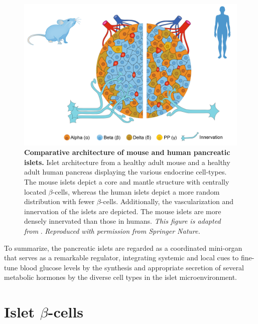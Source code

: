 \begin{figure}[H]
    \centering
    \includegraphics[width=12cm]{Chapter1/Fig/F1-2-1-01.png}
    \caption[Comparative architecture of mouse and human pancreatic islets]{\textbf{Comparative architecture of mouse and human pancreatic islets.} Islet architecture from a healthy adult mouse and a healthy adult human pancreas displaying the various endocrine cell-types. The mouse islets depict a core and mantle structure with centrally located $\beta$-cells, whereas the human islets depict a more random distribution with fewer $\beta$-cells. Additionally, the vascularization and innervation of the islets are depicted. The mouse islets are more densely innervated than those in humans. \textit{This figure is adapted from }\textbf{\cite{jain_targeting_2022,noguchi_integrating_2019}}. \textit{ Reproduced with permission from Springer Nature.}}
    \label{fig:chp1_mouse_human_islets}
\end{figure}

\par To summarize, the pancreatic islets are regarded as a coordinated mini-organ that serves as a remarkable regulator, integrating systemic and local cues to fine-tune blood glucose levels by the synthesis and appropriate secretion of several metabolic hormones by the diverse cell types in the islet microenvironment.


\clearpage



\section{ Islet $\beta$-cells}  %
\label{sec:islet-betacells}  

